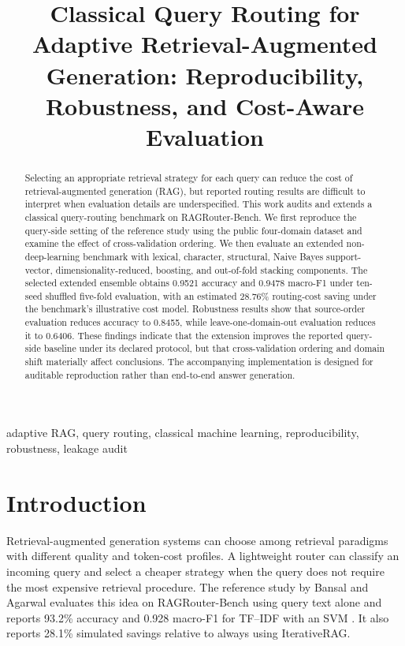 \documentclass[conference]{IEEEtran}
\title{Classical Query Routing for Adaptive Retrieval-Augmented Generation: Reproducibility, Robustness, and Cost-Aware Evaluation}
\author{\IEEEauthorblockN{Phan Ba Song Toan}
\IEEEauthorblockA{FPT University\\
Da Nang 550000, Vietnam\\
Email: \texttt{phanbasongtoan112@gmail.com}}}
\begin{document}
\maketitle

\begin{abstract}
Selecting an appropriate retrieval strategy for each query can reduce the cost of retrieval-augmented generation (RAG), but reported routing results are difficult to interpret when evaluation details are underspecified. This work audits and extends a classical query-routing benchmark on RAGRouter-Bench. We first reproduce the query-side setting of the reference study using the public four-domain dataset and examine the effect of cross-validation ordering. We then evaluate an extended non-deep-learning benchmark with lexical, character, structural, Naive Bayes support-vector, dimensionality-reduced, boosting, and out-of-fold stacking components. The selected extended ensemble obtains 0.9521 accuracy and 0.9478 macro-F1 under ten-seed shuffled five-fold evaluation, with an estimated 28.76\% routing-cost saving under the benchmark's illustrative cost model. Robustness results show that source-order evaluation reduces accuracy to 0.8455, while leave-one-domain-out evaluation reduces it to 0.6406. These findings indicate that the extension improves the reported query-side baseline under its declared protocol, but that cross-validation ordering and domain shift materially affect conclusions. The accompanying implementation is designed for auditable reproduction rather than end-to-end answer generation.
\end{abstract}

\begin{IEEEkeywords}
adaptive RAG, query routing, classical machine learning, reproducibility, robustness, leakage audit
\end{IEEEkeywords}

\section{Introduction}
Retrieval-augmented generation systems can choose among retrieval paradigms with different quality and token-cost profiles. A lightweight router can classify an incoming query and select a cheaper strategy when the query does not require the most expensive retrieval procedure. The reference study by Bansal and Agarwal evaluates this idea on RAGRouter-Bench using query text alone and reports 93.2\% accuracy and 0.928 macro-F1 for TF--IDF with an SVM \cite{bansal2026}. It also reports 28.1\% simulated savings relative to always using IterativeRAG.
\end{document}
